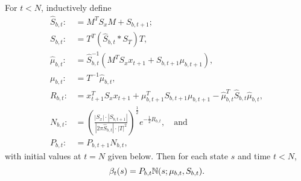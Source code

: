 \documentclass[12pt,leqno]{article}
\begin{document}
\begin{Thm}\label{beta:1}
  For $t < N$, inductively define
\begin{align*}
  \hat{S}_{b,t} :&= M^TS_xM + S_{b,t+1};\\
  S_{b,t} :&= T^T(\hat{S}_{b,t}*S_T)T,\\
  \hat{\mu}_{b,t} :&= \hat{S}_{b,t}^{-1}(M^TS_xx_{t+1} + S_{b,t+1}\mu_{b,t+1}),\\
  \mu_{b,t} :&= T^{-1}\hat{\mu}_{b,t},\\
  R_{b,t} :&= x_{t+1}^TS_xx_{t+1} + \mu_{b,t+1}^TS_{b,t+1}\mu_{b,t+1} - \hat{\mu}_{b,t}^T\hat{S}_{b,t}\hat{\mu}_{b,t},\\
  N_{b,t} :&= \left(\frac{|S_x|\cdot|S_{b,t+1}|}{|2\pi\hat{S}_{b,t}|\cdot|T|^2}\right)^{\frac{1}{2}}e^{-\frac{1}{2}R_{b,t}},\quad\text{and}\\
  P_{b,t}:&=P_{b,t+1}N_{b,t},
\end{align*}
with initial values at $t = N$ given below. Then for each state $s$ and time $t < N$,
$$
  \beta_t(s) = P_{b,t}{\mathbb N}(s;\mu_{b,t},S_{b,t}).
$$
\end{Thm}
\end{document}

